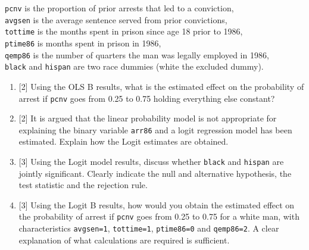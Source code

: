 \documentclass[12pt]{article}
\begin{document}
\begin{enumerate}
\verb|pcnv| is the proportion of prior arrests that led to a conviction, \\
\verb|avgsen| is the average sentence served from prior convictions, \\
\verb|tottime| is the months spent in prison since age 18 prior to 1986,  \\
\verb|ptime86| is months spent in prison in 1986, \\
\verb|qemp86| is the number of quarters the man was legally employed in 1986, \\
\verb|black| and \verb|hispan| are two race dummies (white the excluded dummy). 


\begin{enumerate}
    \item {[2]}  Using the OLS B results, 
    what is the estimated effect on the probability of arrest if \verb|pcnv| goes from 0.25 to 0.75 holding everything else constant?
    \item {[2]} It is argued that the linear probability model is not appropriate for explaining the binary variable  \verb|arr86| and a logit regression model has been estimated. 
    Explain how the Logit estimates are obtained.
    \item  {[3]} Using the Logit model results, discuss whether \verb|black| and \verb|hispan| are jointly significant. 
    Clearly indicate the null and alternative hypothesis, the test statistic and the rejection rule.
    \item {[3]} Using the Logit B results, 
    how would you obtain the estimated effect on the probability of arrest if \verb|pcnv| goes from 0.25 to 0.75 for a white man, 
    with characteristics \verb|avgsen=1|, \verb|tottime=1|, \verb|ptime86=0| and \verb|qemp86=2|. 
    A clear explanation of what calculations are required is sufficient.
\end{enumerate}




\end{enumerate}
\end{document}
